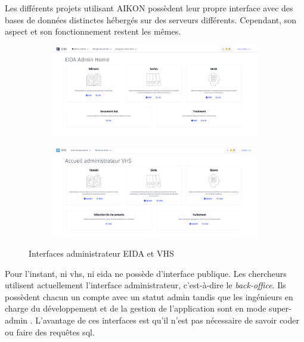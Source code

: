 Les différents projets utilisant AIKON possèdent leur propre interface avec des bases de données distinctes hébergés sur des serveurs différents. Cependant, son aspect et son fonctionnement restent les mêmes.

\begin{figure}[h]
	\centering
	\begin{subfigure}{0.48\linewidth}
		\centering
		\includegraphics[width=\linewidth]{images/accueil_eida.png}
	\end{subfigure}
	\hfill
	\begin{subfigure}{0.48\linewidth}
		\centering
		\includegraphics[width=\linewidth]{images/accueil_vhs.png}
	\end{subfigure}
	\caption{Interfaces administrateur EIDA et VHS}
	\label{fig:interface_accueil}
\end{figure}

Pour l'instant, ni \gls{vhs}, ni \gls{eida} ne possède d'interface publique. Les chercheurs utilisent actuellement l'interface administrateur, c'est-à-dire le \textit{back-office}. Ils possèdent chacun un compte avec un statut \og admin \fg tandis que les ingénieurs en charge du développement et de la gestion de l'application sont en mode \og super-admin \fg. L'avantage de ces interfaces est qu'il n'est pas nécessaire de savoir coder ou faire des requêtes \gls{sql}. 

